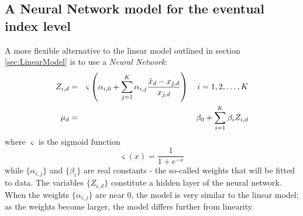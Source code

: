 \documentclass[a4paper,11pt,pdftex,twoside,titlepage]{article}
\begin{document}
\subsection{A Neural Network model for the eventual index level}
\label{sec:NNModel}
A more flexible alternative to the linear model outlined in section
\ref{sec:LinearModel} is to use a {\it Neural Network}:
\begin{eqnarray*}
  Z_{i, d} &=& \varsigma\left(\alpha_{i,0} +
               \sum_{j=1}^K \alpha_{i,j}
               {\tilde x_d - x_{j, d}\over x_{j, d}}
               \right)
               \quad i=1,2,\dots, K\\
  \mu_d &=& \beta_0 + \sum_{i=1}^K \beta_i Z_{i, d}
\end{eqnarray*}
where $\varsigma$ is the sigmoid function
\[
  \varsigma(x) = \frac{1}{1 + e^{-x}}
\]
while $\{\alpha_{i,j}\}$ and $\{\beta_i\}$ are real constants - the
so-called weights that will be fitted to data. The variables $\{Z_{i, d}\}$
constitute a hidden layer of the neural network. When the weights
$\{\alpha_{i,j}\}$ are near 0, the model is very similar to the
linear model; as the weights become larger, the model differs further
from linearity.
\end{document}
